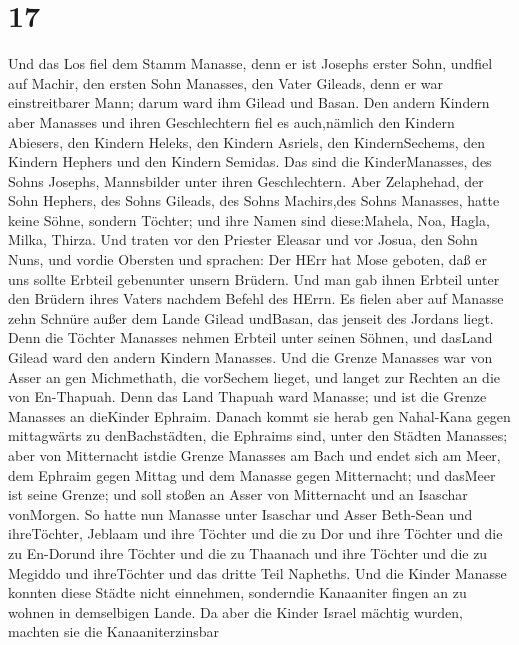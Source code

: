 \hypertarget{section-16}{%
\section{17}\label{section-16}}

 Und das Los fiel dem Stamm Manasse, denn er ist Josephs
erster Sohn, undfiel auf Machir, den ersten Sohn Manasses, den Vater
Gileads, denn er war einstreitbarer Mann; darum ward ihm Gilead und
Basan.  Den andern Kindern aber Manasses und ihren
Geschlechtern fiel es auch,nämlich den Kindern Abiesers, den Kindern
Heleks, den Kindern Asriels, den KindernSechems, den Kindern Hephers und
den Kindern Semidas. Das sind die KinderManasses, des Sohns Josephs,
Mannsbilder unter ihren Geschlechtern.  Aber Zelaphehad, der
Sohn Hephers, des Sohns Gileads, des Sohns Machirs,des Sohns Manasses,
hatte keine Söhne, sondern Töchter; und ihre Namen sind diese:Mahela,
Noa, Hagla, Milka, Thirza.  Und traten vor den Priester
Eleasar und vor Josua, den Sohn Nuns, und vordie Obersten und sprachen:
Der HErr hat Mose geboten, daß er uns sollte Erbteil gebenunter unsern
Brüdern. Und man gab ihnen Erbteil unter den Brüdern ihres Vaters
nachdem Befehl des HErrn.  Es fielen aber auf Manasse zehn
Schnüre außer dem Lande Gilead undBasan, das jenseit des Jordans liegt.
 Denn die Töchter Manasses nehmen Erbteil unter seinen
Söhnen, und dasLand Gilead ward den andern Kindern Manasses.
 Und die Grenze Manasses war von Asser an gen Michmethath,
die vorSechem lieget, und langet zur Rechten an die von En-Thapuah.
 Denn das Land Thapuah ward Manasse; und ist die Grenze
Manasses an dieKinder Ephraim.  Danach kommt sie herab gen
Nahal-Kana gegen mittagwärts zu denBachstädten, die Ephraims sind, unter
den Städten Manasses; aber von Mitternacht istdie Grenze Manasses am
Bach und endet sich am Meer,  dem Ephraim gegen Mittag und
dem Manasse gegen Mitternacht; und dasMeer ist seine Grenze; und soll
stoßen an Asser von Mitternacht und an Isaschar vonMorgen. 
So hatte nun Manasse unter Isaschar und Asser Beth-Sean und ihreTöchter,
Jeblaam und ihre Töchter und die zu Dor und ihre Töchter und die zu
En-Dorund ihre Töchter und die zu Thaanach und ihre Töchter und die zu
Megiddo und ihreTöchter und das dritte Teil Napheths.  Und
die Kinder Manasse konnten diese Städte nicht einnehmen, sonderndie
Kanaaniter fingen an zu wohnen in demselbigen Lande.  Da
aber die Kinder Israel mächtig wurden, machten sie die Kanaaniterzinsbar
